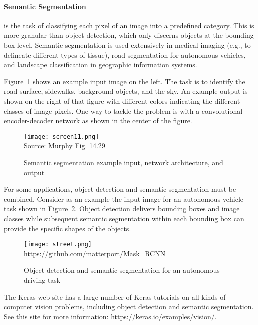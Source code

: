 \paragraph*{Semantic Segmentation} is the task of classifying each pixel of an image into a predefined category. This is more granular than object detection, which only discerns objects at the bounding box level. Semantic segmentation is used extensively in medical imaging (e.g., to delineate different types of tissue), road segmentation for autonomous vehicles, and landscape classification in geographic information systems.

Figure~\ref{fig:screen11_chap16} shows an example input image on the left. The task is to identify the road surface, sidewalks, background objects, and the sky. An example output is shown on the right of that figure with different colors indicating the different classes of image pixels. One way to tackle the problem is with a convolutional encoder-decoder network as shown in the center of the figure.

\begin{figure}
\centering
\texttt{[image: screen11.png]} \\

\scriptsize Source: Murphy Fig. 14.29
\normalsize
\caption{Semantic segmentation example input, network architecture, and output}
\label{fig:screen11_chap16}
\end{figure}

For some applications, object detection and semantic segmentation must be combined. Consider as an example the input image for an autonomous vehicle task shown in Figure~\ref{fig:street}. Object detection delivers bounding boxes and image classes while subsequent semantic segmentation within each bounding box can provide the specific shapes of the objects.

\begin{figure}
\centering
\texttt{[image: street.png]} \\

\scriptsize \url{https://github.com/matterport/Mask_RCNN}
\caption[Object detection and semantic segmentation example]{Object detection and semantic segmentation for an autonomous driving task}
\label{fig:street}
\end{figure}

\begin{resourcebox}
The Keras web site has a large number of Keras tutorials on all kinds of computer vision problems, including object detection and semantic segmentation. See this site for more information: \small\url{https://keras.io/examples/vision/}\normalsize.
\end{resourcebox}

